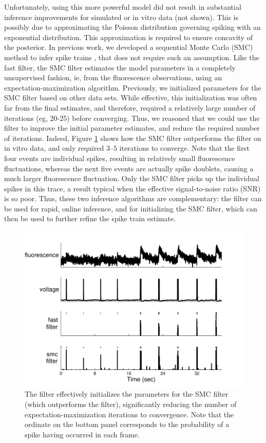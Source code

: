 Unfortunately, using this more powerful model did not result in substantial inference improvements for simulated or in vitro data (not shown).  This is possibly due to approximating the Poisson distribution governing spiking with an exponential distribution.  This approximation is required to ensure concavity of the posterior.  In previous work, we developed a sequential Monte Carlo (SMC) method to infer spike trains \cite{VogelsteinPaninski09}, that does not require such an assumption. Like the fast filter, the SMC filter estimates the model parameters in a completely unsupervised fashion, ie, from the fluorescence observations, using an expectation-maximization algorithm.  Previously, we initialized parameters for the SMC filter based on other data sets.  While effective, this initialization was often far from the final estimates, and therefore, required a relatively large number of iterations (eg, 20-25) before converging.  Thus, we reasoned that we could use the \foopsi filter to improve the initial parameter estimates, and reduce the required number of iterations.  Indeed, Figure \ref{fig:smc_init} shows how the SMC filter outperforms the \foopsi filter on in vitro data, and only required $3$--$5$ iterations to converge.  Note that the first four events are individual spikes, resulting in relatively small fluorescence fluctuations, whereas the next five events are actually spike doublets, causing a much larger fluorescence fluctuation.  Only the SMC filter picks up the individual spikes in this trace, a result typical when the effective signal-to-noise ratio (SNR) is so poor.  Thus, these two inference algorithms are complementary: the \foopsi filter can be used for rapid, online inference, and for initializing the SMC filter, which can then be used to further refine the spike train estimate.

\begin{figure}[h!]
\centering \includegraphics[width=.9\linewidth]{../figs/smc_init}
\caption{The \foopsi filter effectively initializes the parameters for the SMC filter (which outperforms the \foopsi filter), significantly reducing the number of expectation-maximization iterations to convergence.  Note that the ordinate on the bottom panel corresponds to the probability of a spike having occurred in each frame.} \label{fig:smc_init}
\end{figure}

